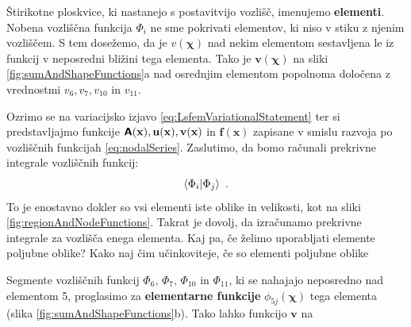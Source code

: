 Štirikotne ploskvice, ki nastanejo s postavitvijo vozlišč, imenujemo \textbf{elementi}. Nobena vozliščna funkcija $\Phi_i$ ne sme pokrivati elementov, ki niso v stiku z njenim vozliščem. S tem dosežemo, da je $v(\bm\chi)$ nad nekim elementom sestavljena le iz funkcij v neposredni bližini tega elementa. Tako je $\mathbf{v}(\bm\chi)$ na sliki \ref{fig:sumAndShapeFunctions}a nad osrednjim elementom popolnoma določena z vrednostmi $v_6, v_7, v_{10}$ in $v_{11}$.

Ozrimo se na variacijsko izjavo \eqref{eq:LsfemVariationalStatement} ter si predstavljajmo funkcije $\bm{\mathsf{A}}(\mathbf{x}), \mathbf{u(x)}, \mathbf{v(x)}$ in $\mathbf{f(x)}$ zapisane v smislu razvoja po vozliščnih funkcijah \eqref{eq:nodalSeries}. Zaslutimo, da bomo računali prekrivne integrale vozliščnih funkcij:
\begin{equation}
    \bra{\Phi_i}\ket{\Phi_j} \ .
\end{equation}
To je enostavno dokler so vsi elementi iste oblike in velikosti, kot na sliki \ref{fig:regionAndNodeFunctions}. Takrat je dovolj, da izračunamo prekrivne integrale za vozlišča enega elementa. Kaj pa, če želimo uporabljati elemente poljubne oblike? Kako naj čim učinkoviteje, če so elementi poljubne oblike

 Segmente vozliščnih funkcij $\Phi_6, \, \Phi_7, \, \Phi_{10}$ in $\Phi_{11}$, ki se nahajajo neposredno nad elementom 5, proglasimo za \textbf{elementarne funkcije} $\phi_{5 j}(\bm\chi)$ tega elementa (slika \ref{fig:sumAndShapeFunctions}b). Tako lahko funkcijo $\mathbf{v}$ na

